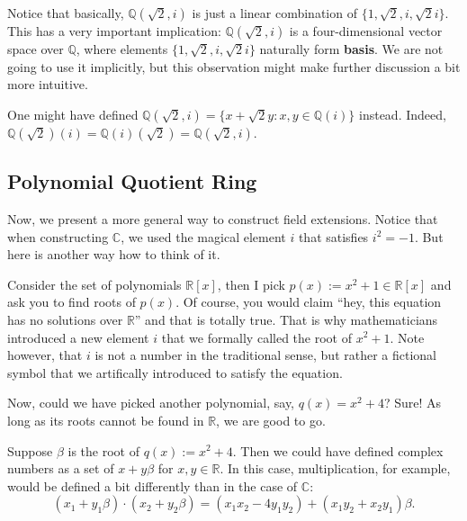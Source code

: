 \documentclass[../lecture-notes.tex]{subfiles}
\begin{document}
\begin{remark}
    Notice that basically, $\mathbb{Q}(\sqrt{2}, i)$ is just a linear combination of $\{1,\sqrt{2},i,\sqrt{2}i\}$. This has a very important implication: $\mathbb{Q}(\sqrt{2}, i)$ is a four-dimensional vector space over $\mathbb{Q}$, where elements $\{1,\sqrt{2},i,\sqrt{2}i\}$ naturally form \textbf{basis}. We are not going to use it implicitly, but this observation might make further discussion a bit more intuitive.
\end{remark}

\begin{remark}
    One might have defined $\mathbb{Q}(\sqrt{2}, i) = \{x+\sqrt{2}y: x,y \in \mathbb{Q}(i)\}$ instead. Indeed, $\mathbb{Q}(\sqrt{2})(i) = \mathbb{Q}(i)(\sqrt{2}) = \mathbb{Q}(\sqrt{2}, i)$.
\end{remark}

\subsection{Polynomial Quotient Ring}

Now, we present a more general way to construct field extensions. Notice that when constructing $\mathbb{C}$, we used the magical element $i$ that satisfies $i^2=-1$. But here is another way how to think of it.

Consider the set of polynomials $\mathbb{R}[x]$, then I pick $p(x):=x^2+1 \in \mathbb{R}[x]$ and ask you to find roots of $p(x)$. Of course, you would claim ``hey, this equation has no solutions over $\mathbb{R}$'' and that is totally true. That is why mathematicians introduced a new element $i$ that we formally called the root of $x^2+1$. Note however, that $i$ is not a number in the traditional sense, but rather a fictional symbol that we artifically introduced to satisfy the equation.

Now, could we have picked another polynomial, say, $q(x) = x^2+4$? Sure! As long as its roots cannot be found in $\mathbb{R}$, we are good to go.

\begin{example}
    Suppose $\beta$ is the root of $q(x):=x^2+4$. Then we could have defined complex numbers as a set of $x+y\beta$ for $x,y \in \mathbb{R}$. In this case, multiplication, for example, would be defined a bit differently than in the case of $\mathbb{C}$:
    \begin{equation}
        (x_1+y_1\beta) \cdot (x_2+y_2\beta) = (x_1x_2-4y_1y_2) + (x_1y_2+x_2y_1)\beta.
    \end{equation}
\end{example}
\end{document}
